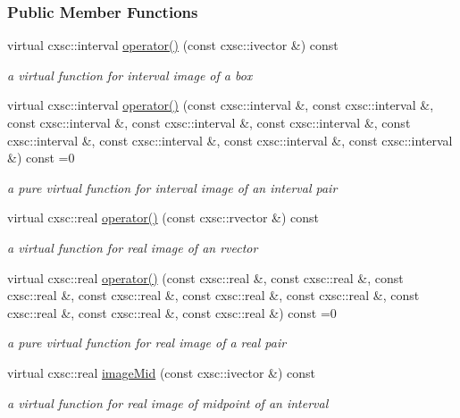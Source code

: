 \subsubsection*{\-Public \-Member \-Functions}
\begin{DoxyCompactItemize}
\item 
virtual cxsc\-::interval \hyperlink{classsubpavings_1_1MappedFobj9D_a0c9a69f77d14c31397b866582d678989}{operator()} (const cxsc\-::ivector \&) const 
\begin{DoxyCompactList}\small\item\em a virtual function for interval image of a box \end{DoxyCompactList}\item 
virtual cxsc\-::interval \hyperlink{classsubpavings_1_1MappedFobj9D_a669736807e7295183f154e2a3a3eff96}{operator()} (const cxsc\-::interval \&, const cxsc\-::interval \&, const cxsc\-::interval \&, const cxsc\-::interval \&, const cxsc\-::interval \&, const cxsc\-::interval \&, const cxsc\-::interval \&, const cxsc\-::interval \&, const cxsc\-::interval \&) const =0
\begin{DoxyCompactList}\small\item\em a pure virtual function for interval image of an interval pair \end{DoxyCompactList}\item 
virtual cxsc\-::real \hyperlink{classsubpavings_1_1MappedFobj9D_afb61ca5bd02d0c1722a8163ec10da8ec}{operator()} (const cxsc\-::rvector \&) const 
\begin{DoxyCompactList}\small\item\em a virtual function for real image of an rvector \end{DoxyCompactList}\item 
virtual cxsc\-::real \hyperlink{classsubpavings_1_1MappedFobj9D_a7bf854d96c0308f9c667e6802207c124}{operator()} (const cxsc\-::real \&, const cxsc\-::real \&, const cxsc\-::real \&, const cxsc\-::real \&, const cxsc\-::real \&, const cxsc\-::real \&, const cxsc\-::real \&, const cxsc\-::real \&, const cxsc\-::real \&) const =0
\begin{DoxyCompactList}\small\item\em a pure virtual function for real image of a real pair \end{DoxyCompactList}\item 
virtual cxsc\-::real \hyperlink{classsubpavings_1_1MappedFobj9D_ae6b4df772501834576ace428df64b0ee}{image\-Mid} (const cxsc\-::ivector \&) const 
\begin{DoxyCompactList}\small\item\em a virtual function for real image of midpoint of an interval \end{DoxyCompactList}\item 

\end{DoxyCompactItemize}

